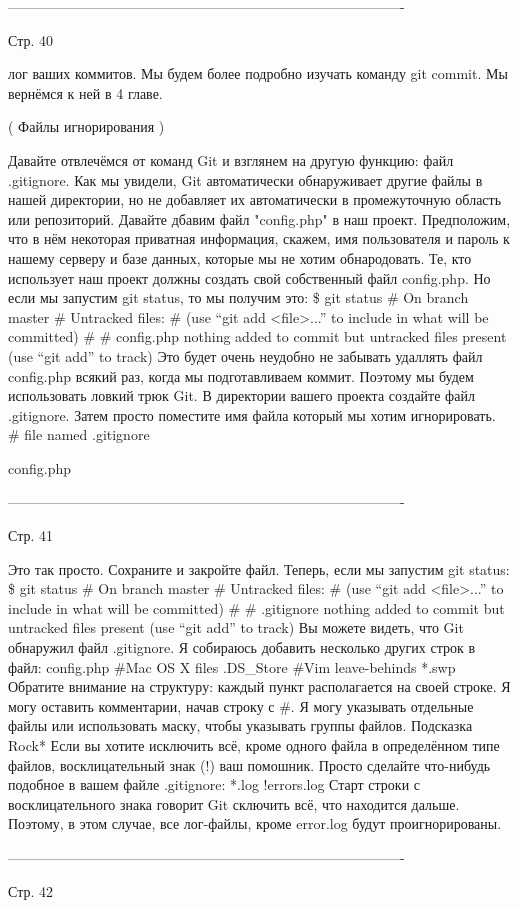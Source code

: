 -------------------------------------------------------------------------------------

Стр. 40

лог ваших коммитов. Мы будем более подробно изучать команду git commit. Мы вернёмся к
ней в 4 главе.

( Файлы игнорирования )

Давайте отвлечёмся от команд Git и взглянем на другую функцию: файл .gitignore. Как мы
увидели, Git автоматически обнаруживает другие файлы в нашей директории, но не 
добавляет их автоматически в промежуточную область или репозиторий. Давайте дбавим файл
"config.php" в наш проект. Предположим, что в нём некоторая приватная информация, скажем,
имя пользователя и пароль к нашему серверу и базе данных, которые мы не хотим 
обнародовать. Те, кто использует наш проект должны создать свой собственный файл 
config.php. Но если мы запустим git status, то мы получим это:
\$ git status
# On branch master
# Untracked files:
#
(use “git add <file>...” to include in what will be
committed)
#
#       
config.php
nothing added to commit but untracked files present (use
“git add” to track)
Это будет очень неудобно не забывать удаллять файл config.php всякий раз, когда мы 
подготавливаем коммит. Поэтому мы будем использовать ловкий трюк Git. В директории
вашего проекта создайте файл .gitignore. Затем просто поместите имя файла который
мы хотим игнорировать.
# file named .gitignore
       
config.php

-------------------------------------------------------------------------------------

Стр. 41

Это так просто. Сохраните и закройте файл. Теперь, если мы запустим git status:
\$ git status
# On branch master
# Untracked files:
#
(use “git add <file>...” to include in what will be
committed)
#
#       
.gitignore
nothing added to commit but untracked files present (use
“git add” to track)
Вы можете видеть, что Git обнаружил файл .gitignore. Я собираюсь добавить несколько
других строк в файл:
config.php
#Mac OS X files
.DS_Store
#Vim leave-behinds
*.swp
Обратите внимание на структуру: каждый пункт располагается на своей строке. Я могу
оставить комментарии, начав строку с #. Я могу указывать отдельные файлы или 
использовать маску, чтобы указывать группы файлов.
        Подсказка Rock*
        Если вы хотите исключить всё, кроме одного файла в определённом типе файлов,
        восклицательный знак (!) ваш помошник. Просто сделайте что-нибудь подобное в 
        вашем файле .gitignore:
        *.log
        !errors.log
        Старт строки с восклицательного знака говорит Git сключить всё, что находится 
        дальше. Поэтому, в этом случае, все лог-файлы, кроме error.log будут 
        проигнорированы.

-------------------------------------------------------------------------------------

Стр. 42